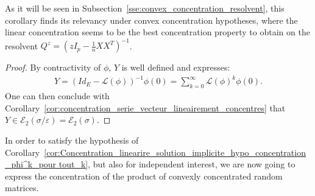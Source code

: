 \documentclass{ws-rmta}
\begin{document}
As it will be seen in Subsection~\ref{sse:convex_concentration_resolvent}, this corollary finds its relevancy under convex concentration hypotheses, where the linear concentration seems to be the best concentration property to obtain on the resolvent $Q^z = (z I_p - \frac{1}{n}XX^T)^{-1}$.
\begin{proof}
  By contractivity of $\phi$, $Y$ is well defined and expresses:
  \begin{align*}
    Y = ( Id_E - \mathcal L(\phi))^{-1} \phi(0) = \sum_{k=0}^\infty \mathcal L(\phi)^k \phi(0).
  \end{align*}
  One can then conclude with Corollary~\ref{cor:concentration_serie_vecteur_lineairement_concentres} that $Y \in \mathcal E_2(\sigma/\varepsilon) = \mathcal E_2(\sigma)$.
\end{proof}

In order to satisfy the hypothesis of Corollary~\ref{cor:Concentration_linearire_solution_implicite_hypo_concentration_phi^k_pour tout_k}, but also for independent interest, we are now going to express the concentration of the product of convexly concentrated random matrices.
\end{document}
